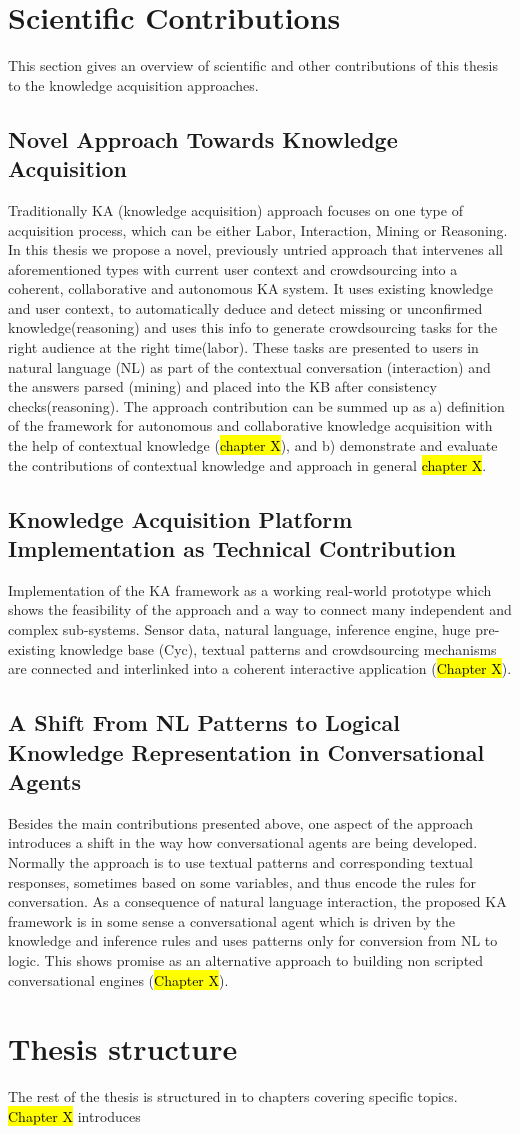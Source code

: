 \section{Scientific Contributions}
This section gives an overview of scientific and other contributions of this thesis to the knowledge acquisition approaches.

\subsection{Novel Approach Towards Knowledge Acquisition}
Traditionally KA (knowledge acquisition) approach focuses on one type of acquisition process, which can be either Labor, Interaction, Mining or Reasoning\parencite{Zang2013}. In this thesis we propose a novel, previously untried approach that intervenes all aforementioned types with current user context and crowdsourcing into a coherent, collaborative and autonomous KA system. It uses existing knowledge and user context, to automatically deduce and detect  missing or unconfirmed knowledge(reasoning) and uses this info to generate crowdsourcing tasks for the right audience at the right time(labor). These tasks are presented to users in natural language (NL) as part of the contextual conversation (interaction) and the answers parsed (mining) and placed into the KB after consistency checks(reasoning). The approach contribution can be summed up as a) definition of the framework for autonomous and collaborative knowledge acquisition with the help of contextual knowledge (\hl{chapter X}), and b) demonstrate and evaluate the contributions of contextual knowledge and approach in general \hl{chapter X}.

\subsection{Knowledge Acquisition Platform Implementation as Technical Contribution }
Implementation of the KA framework as a working real-world prototype which shows the feasibility of the approach and a way to connect many independent and complex sub-systems. Sensor data, natural language, inference engine, huge pre-existing knowledge base (Cyc)\parencite{Lenat1995}, textual patterns and crowdsourcing mechanisms are connected and interlinked into a coherent interactive application (\hl{Chapter X}).

\subsection{A Shift From NL Patterns to Logical Knowledge Representation in Conversational Agents}
Besides the main contributions presented above, one aspect of the approach introduces a shift in the way how conversational agents are being developed. Normally the approach is to use textual patterns and corresponding textual responses, sometimes based on some variables, and thus encode the rules for conversation. As a consequence of natural language interaction, the proposed KA framework is in some sense a conversational agent which is driven by the knowledge and inference rules and uses patterns only for conversion from NL to logic. This shows promise as an alternative approach to building non scripted conversational engines (\hl{Chapter X}).

\section{Thesis structure}
The rest of the thesis is structured in to chapters covering specific topics. \hl{Chapter X} introduces
